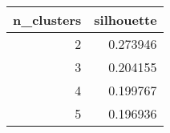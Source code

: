 \begin{tabular}{rr}
\toprule
 n\_clusters &  silhouette \\
\midrule
          2 &    0.273946 \\
          3 &    0.204155 \\
          4 &    0.199767 \\
          5 &    0.196936 \\
\bottomrule
\end{tabular}
